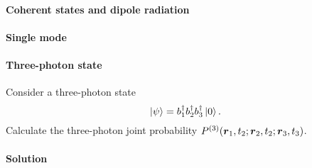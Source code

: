 \documentclass[hyperref, a4paper]{article}
\begin{document}
\paragraph{Coherent states and dipole radiation} 

\paragraph{Single mode} 

\paragraph{Three-photon state} Consider a three-photon state
\begin{equation}
    \ket*{\psi} = b_1^\dagger b_2^\dagger b_3^\dagger \ket*{0}.
\end{equation}
Calculate the three-photon joint probability $P^{(3)}(\vb*{r}_1, t_2; \vb*{r}_2, t_2; \vb*{r}_3, t_3)$.

\paragraph{Solution} 


 
\end{document}
